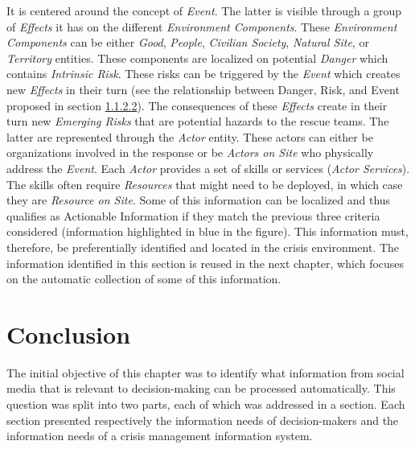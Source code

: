 It is centered around the concept of \textit{Event}.
The latter is visible through a group of \textit{Effects} it has on the different \textit{Environment Components}.
These \textit{Environment Components} can be either \textit{Good}, \textit{People}, \textit{Civilian Society}, \textit{Natural Site}, or \textit{Territory} entities.
These components are localized on potential \textit{Danger} which contains \textit{Intrinsic Risk}.
These risks can be triggered by the \textit{Event} which creates new \textit{Effects} in their turn (see the relationship between Danger, Risk, and Event proposed in section \hyperref[sec:danger-risk-consequence]{1.1.2.2}).
The consequences of these \textit{Effects} create in their turn new \textit{Emerging Risks} that are potential hazards to the rescue teams.
The latter are represented through the \textit{Actor} entity.
These actors can either be organizations involved in the response or be \textit{Actors on Site} who physically address the \textit{Event}.
Each \textit{Actor} provides a set of skills or services (\textit{Actor Services}).
The skills often require \textit{Resources} that might need to be deployed, in which case they are \textit{Resource on Site}.
Some of this information can be localized and thus qualifies as Actionable Information if they match the previous three criteria considered (information highlighted in blue in the figure).
This information must, therefore, be preferentially identified and located in the crisis environment.
The information identified in this section is reused in the next chapter, which focuses on the automatic collection of some of this information.

\section*{Conclusion}
The initial objective of this chapter was to identify what information from social media that is relevant to decision-making can be processed automatically.
This question was split into two parts, each of which was addressed in a section.
Each section presented respectively the information needs of decision-makers and the information needs of a crisis management information system.

